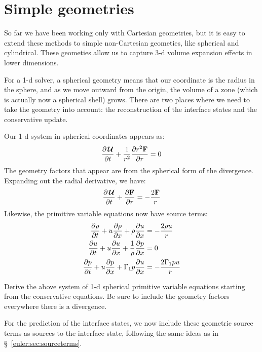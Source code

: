 \section{Simple geometries}
\label{ch:euler:geom}

So far we have been working only with Cartesian geometries, but it is
easy to extend these methods to simple non-Cartesian geometies, like
spherical and cylindrical.  These geometies allow us to capture 3-d
volume expansion effects in lower dimensions.

For a 1-d solver, a spherical geometry means that our coordinate is
the radius in the sphere, and as we move outward from the origin, the
volume of a zone (which is actually now a spherical shell) grows.
There are two places where we need to take the geometry into account:
the reconstruction of the interface states and the conservative update.

Our 1-d system in spherical coordinates appears as:
\begin{equation}
{\frac{{\partial{\,\boldsymbol{\mathcal{U}}}}}{\partial t}} + \frac{1}{r^2} {\frac{{\partial r^2 {\bf F}}}{\partial r}} = 0
\end{equation}
The geometry factors that appear are from the spherical form of the
divergence.  Expanding out the radial derivative, we have:
\begin{equation}
{\frac{{\partial{\,\boldsymbol{\mathcal{U}}}}}{\partial t}} + {\frac{{\partial{\bf F}}}{\partial r}} = -\frac{2{\bf F}}{r}
\end{equation}
Likewise, the primitive variable equations now have source terms:
\begin{align}
{\frac{{\partial\rho}}{\partial t}} + u {\frac{{\partial\rho}}{\partial x}} + \rho {\frac{{\partial u}}{\partial x}} &= -\frac{2\rho u}{r} \\
{\frac{{\partial u}}{\partial t}} + u {\frac{{\partial u}}{\partial x}} + \frac{1}{\rho} {\frac{{\partial p}}{\partial x}} &= 0 \\
{\frac{{\partial p}}{\partial t}} + u {\frac{{\partial p}}{\partial x}} + \Gamma_1 p {\frac{{\partial u}}{\partial x}} &= -\frac{2\Gamma_1 p u}{r}
\end{align}

\begin{exercise}
{Derive the above system of 1-d spherical primitive variable equations
  starting from the conservative equations.  Be sure to include the
  geometry factors everywhere there is a divergence.}
\end{exercise}

For the prediction of the interface states, we now include these
geometric source terms as sources to the interface state, following
the same ideas as in \S~\ref{euler:sec:sourceterms}.

